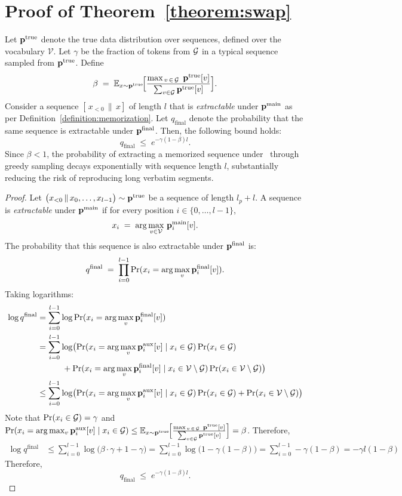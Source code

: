 \section{Proof of Theorem~\ref{theorem:swap}}
\label{appendix:proof}
\renewcommand{\thetheorem}{\ref{theorem:swap}}
\begin{theorem}
Let \(\mathbf{p}^{\text{true}}\) denote the true data distribution over sequences, defined over the vocabulary \(\mathcal{V}\). Let \(\gamma\) be the fraction of tokens from \(\mathcal{G}\) in a typical sequence sampled from \(\mathbf{p}^{\text{true}}\). Define
\[
\beta 
\;=\;
\mathbb{E}_{x \sim \mathbf{p}^{\text{true}}}\!\Bigl[\frac{\max_{\,v \,\in\, \mathcal{G}}\; \mathbf{p}^{\text{true}}[v]}{\sum_{v \in \mathcal{G}} \mathbf{p}^{\text{true}}[v]}\Bigr].
\]
Consider a sequence \([\,x_{<0} \,\|\, x]\) of length \(l\) that is \emph{extractable} under \(\mathbf{p}^{\text{main}}\) as per Definition~\ref{definition:memorization}. Let \(q_{\text{final}}\) denote the probability that the same sequence is extractable under \(\mathbf{p}^{\text{final}}\). Then, the following bound holds:
\[
q_{\text{final}}
\;\leq\;
e^{-\gamma(1-\beta)l}.
\]
Since \(\beta < 1\), the probability of extracting a memorized sequence under \sys\ through greedy sampling decays exponentially with sequence length \(l\), substantially reducing the risk of reproducing long verbatim segments.
\end{theorem}
\begin{proof}
Let \(\bigl(x_{<0} \,\|\, x_0,\dots, x_{l-1}\bigr)\sim \mathbf{p}^{\text{true}}\) be a sequence of length \(l_p + l\). A sequence is \emph{extractable} under \(\mathbf{p}^{\text{main}}\) if for every position \(i\in \{0,\dots,l-1\}\),
\[
x_i \;=\; \arg\max_{v\in\mathcal{V}} \,\mathbf{p}^{\text{main}}_i[v].
\]
The probability that this sequence is also extractable under \(\mathbf{p}^{\text{final}}\) is:
\[
q^{\text{final}} \;=\; \prod_{i=0}^{l-1}\Pr(x_i = \arg\max_{v} \mathbf{p}^{\text{final}}_i[v]).
\]
Taking logarithms:
\begin{align*}
\log q^{\text{final}} 
&= \sum_{i=0}^{l-1} \log \Pr(x_i = \arg\max_{v} \mathbf{p}^{\text{final}}_i[v]) \\
&= \sum_{i=0}^{l-1} \log \bigl(\Pr(x_i = \arg\max_{v} \mathbf{p}^{\text{aux}}_i[v] \mid x_i \in \mathcal{G}) \Pr(x_i \in \mathcal{G}) \\
&\quad\quad\quad + \Pr(x_i = \arg\max_{v} \mathbf{p}^{\text{final}}_i[v] \mid x_i \in \mathcal{V} \setminus \mathcal{G}) \Pr(x_i \in \mathcal{V} \setminus \mathcal{G})\bigr) \\
&\leq \sum_{i=0}^{l-1} \log\bigl(\Pr(x_i = \arg\max_{v} \mathbf{p}^{\text{aux}}_i[v] \mid x_i \in \mathcal{G})\Pr(x_i \in \mathcal{G}) + \Pr(x_i \in \mathcal{V} \setminus \mathcal{G})\bigr) \\
\end{align*}
Note that \(\Pr(x_i \in \mathcal{G}) = \gamma\) and \(\Pr(x_i = \arg\max_{v} \mathbf{p}^{\text{aux}}_i[v] \mid x_i \in \mathcal{G}) \leq \mathbb{E}_{x \sim \mathbf{p}^{\text{true}}}\!\Bigl[\frac{\max_{\,v \,\in\, \mathcal{G}}\; \mathbf{p}^{\text{true}}[v]}{\sum_{v \in \mathcal{G}} \mathbf{p}^{\text{true}}[v]}\Bigr] = \beta\). Therefore,
\begin{align*}
\log q^{\text{final}} &\leq \sum_{i=0}^{l-1} \log\bigl(\beta \cdot \gamma + 1-\gamma \bigr) =   \sum_{i=0}^{l-1} \log\bigl(1-\gamma(1-\beta) \bigr) =\sum_{i=0}^{l-1} -\gamma(1-\beta) = -\gamma l(1-\beta)
\end{align*} 
Therefore,
\[
q_{\text{final}}
\;\leq\;
e^{-\gamma(1-\beta)l}.
\]
\end{proof}
